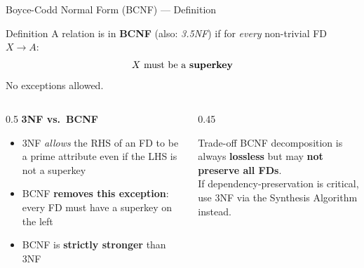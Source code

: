 \begin{frame}{Boyce-Codd Normal Form (BCNF) --- Definition}
  \begin{block}{Definition}
    A relation is in \textbf{BCNF} (also: \emph{3.5NF}) if for
    \emph{every} non-trivial FD $X \to A$:
    \[
      X \text{ must be a \textbf{superkey}}
    \]
    No exceptions allowed.
  \end{block}

  \begin{columns}[t]
    \begin{column}{0.5\textwidth}
      \textbf{3NF vs.\ BCNF}
      \begin{itemize}
        \item 3NF \emph{allows} the RHS of an FD to be a prime attribute
              even if the LHS is not a superkey
        \item BCNF \textbf{removes this exception}: every FD must have a
              superkey on the left
        \item BCNF is \textbf{strictly stronger} than 3NF
      \end{itemize}
    \end{column}
    \begin{column}{0.45\textwidth}
      \begin{alertblock}{Trade-off}
        BCNF decomposition is always \textbf{lossless} but may \textbf{not
        preserve all FDs}.\\[4pt]
        If dependency-preservation is critical, use 3NF via the Synthesis
        Algorithm instead.
      \end{alertblock}
    \end{column}
  \end{columns}
\end{frame}

